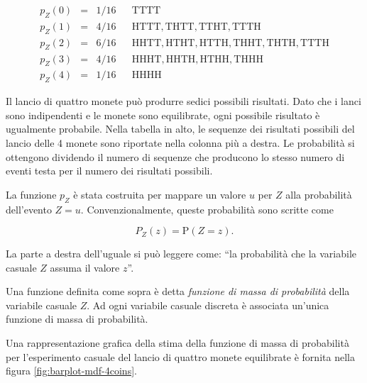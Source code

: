 \documentclass[
  11pt,
]{krantz}
\theoremstyle{definition}
\theoremstyle{definition}
\theoremstyle{definition}
\theoremstyle{definition}
\theoremstyle{remark}
\begin{document}
\[
\begin{array}{rclll}
p_Z(0) & = & 1/16 & & \mathrm{TTTT}
\\
p_Z(1) & = & 4/16 & & \mathrm{HTTT, THTT, TTHT, TTTH}
\\
p_Z(2) & = & 6/16 & & \mathrm{HHTT, HTHT, HTTH, THHT, THTH, TTTH}
\\
p_Z(3) & = & 4/16 & & \mathrm{HHHT, HHTH, HTHH, THHH}
\\
p_Z(4) & = & 1/16 & & \mathrm{HHHH}
\end{array}
\]

Il lancio di quattro monete può produrre sedici possibili risultati. Dato che i lanci sono indipendenti e le monete sono equilibrate, ogni possibile risultato è ugualmente probabile. Nella tabella in alto, le sequenze dei risultati possibili del lancio delle 4 monete sono riportate nella colonna più a destra. Le probabilità si ottengono dividendo il numero di sequenze che producono lo stesso numero di eventi testa per il numero dei risultati possibili.

La funzione \(p_Z\) è stata costruita per mappare un valore \(u\) per \(Z\) alla probabilità dell'evento \(Z = u\). Convenzionalmente, queste probabilità sono scritte come

\[
P_Z(z) = \mbox{P}(Z = z).
\]

La parte a destra dell'uguale si può leggere come: ``la probabilità che la variabile casuale \(Z\) assuma il valore \(z\)''.

Una funzione definita come sopra è detta \emph{funzione di massa di probabilità} della variabile casuale \(Z\). Ad ogni variabile casuale discreta è associata un'unica funzione di massa di probabilità.

Una rappresentazione grafica della stima della funzione di massa di probabilità per l'esperimento casuale del lancio di quattro monete equilibrate è fornita nella figura \ref{fig:barplot-mdf-4coins}.
\end{document}
